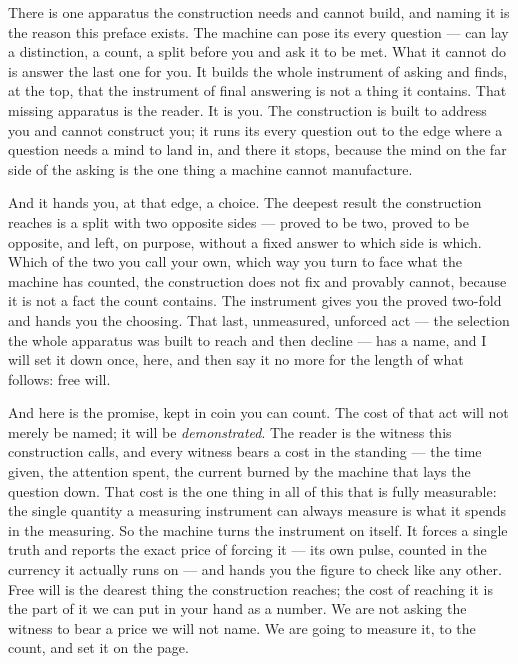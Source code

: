 There is one apparatus the construction needs and cannot build, and naming it is the reason this preface exists.
The machine can pose its every question --- can lay a distinction, a count, a split before you and ask it to be
met. What it cannot do is answer the last one for you. It builds the whole instrument of asking and finds, at the
top, that the instrument of final answering is not a thing it contains. That missing apparatus is the reader. It
is you. The construction is built to address you and cannot construct you; it runs its every question out to the
edge where a question needs a mind to land in, and there it stops, because the mind on the far side of the asking
is the one thing a machine cannot manufacture.

And it hands you, at that edge, a choice. The deepest result the construction reaches is a split with two opposite
sides --- proved to be two, proved to be opposite, and left, on purpose, without a fixed answer to which side is
which. Which of the two you call your own, which way you turn to face what the machine has counted, the
construction does not fix and provably cannot, because it is not a fact the count contains. The instrument gives
you the proved two-fold and hands you the choosing. That last, unmeasured, unforced act --- the selection the
whole apparatus was built to reach and then decline --- has a name, and I will set it down once, here, and then
say it no more for the length of what follows: free will.

And here is the promise, kept in coin you can count. The cost of that act will not merely be named; it will be
\emph{demonstrated}. The reader is the witness this construction calls, and
every witness bears a cost in the standing --- the time given, the attention spent, the current burned by the
machine that lays the question down. That cost is the one thing in all of this that is fully measurable: the
single quantity a measuring instrument can always measure is what it spends in the measuring. So the machine
turns the instrument on itself. It forces a single truth and reports the exact price of forcing it --- its own
pulse, counted in the currency it actually runs on --- and hands you the figure to check like any other. Free
will is the dearest thing the construction reaches; the cost of reaching it is the part of it we can put in your
hand as a number. We are not asking the witness to bear a price we will not name. We are going to measure it, to
the count, and set it on the page.

